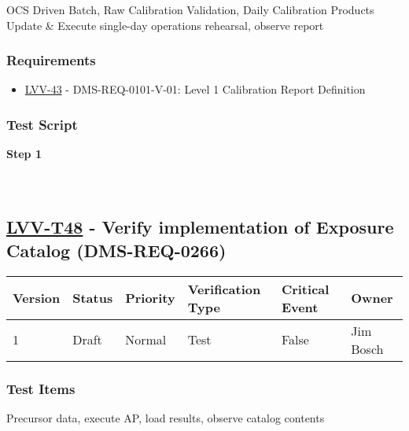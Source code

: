 OCS Driven Batch, Raw Calibration Validation, Daily Calibration Products
Update \& Execute single-day operations rehearsal, observe report

\hypertarget{requirements-24}{%
\subsubsection{Requirements}\label{requirements-24}}

\begin{itemize}
\tightlist
\item
  \href{https://jira.lsstcorp.org/browse/LVV-43}{LVV-43} -
  DMS-REQ-0101-V-01: Level 1 Calibration Report Definition
\end{itemize}

\hypertarget{test-script-24}{%
\subsubsection{Test Script}\label{test-script-24}}

\textbf{Step 1}\\
~\\
~\\

\hypertarget{lvv-t48---verify-implementation-of-exposure-catalog-dms-req-0266}{%
\subsection{\texorpdfstring{\href{https://jira.lsstcorp.org/secure/Tests.jspa\#/testCase/LVV-T48}{LVV-T48}
- Verify implementation of Exposure Catalog
(DMS-REQ-0266)}{LVV-T48 - Verify implementation of Exposure Catalog (DMS-REQ-0266)}}\label{lvv-t48---verify-implementation-of-exposure-catalog-dms-req-0266}}

\begin{longtable}[]{@{}llllll@{}}
\toprule
Version & Status & Priority & Verification Type & Critical Event &
Owner\tabularnewline
\midrule
\endhead
1 & Draft & Normal & Test & False & Jim Bosch\tabularnewline
\bottomrule
\end{longtable}

\hypertarget{test-items-24}{%
\subsubsection{Test Items}\label{test-items-24}}

Precursor data, execute AP, load results, observe catalog contents

